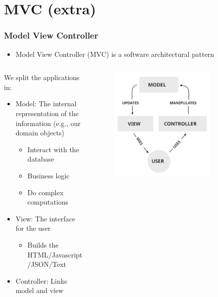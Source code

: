 \documentclass[fleqn,aspectratio=169,10pt]{beamer}
\begin{document}
\section{MVC (extra)}

\begin{frame}[fragile]
  \frametitle{Model View Controller}
  \pause
  \begin{itemize}
    \item Model View Controller (MVC) is a software architectural pattern
  \end{itemize}
  \pause

  \begin{columns}
    \begin{column}{.6\linewidth}
      \begin{block}{We split the applications in:}
        \begin{itemize}
          \item Model: The internal representation of the information (e.g., our domain objects)
                \begin{itemize}
                  \item Interact with the database
                  \item Business logic
                  \item Do complex computations
                \end{itemize}
          \item View: The interface for the user
                \begin{itemize}
                  \item Builds the HTML/Javascript/JSON/Text
                \end{itemize}
          \item Controller: Links model and view
        \end{itemize}
      \end{block}
    \end{column}
    \begin{column}{.4\linewidth}
      \begin{figure}[]
        \centering
        \includegraphics[width=0.8\textwidth]{mvc}

\end{figure}
\end{column}
\end{columns}
\end{frame}
\end{document}
